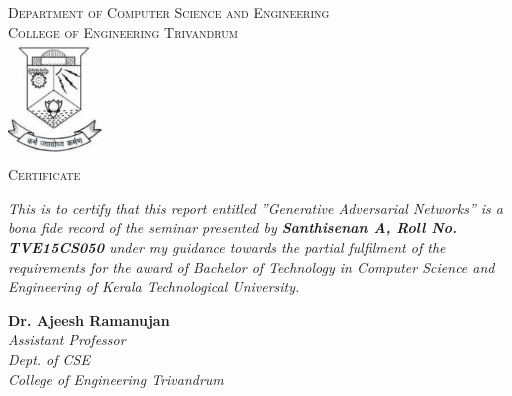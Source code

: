     \begin{center}
        \textsc{\Large{Department of Computer Science and Engineering}}\\[0.25cm]
        \textsc{\Large{College of Engineering Trivandrum}}\\[0.75cm]
        \includegraphics[width=2.5cm]{images/emblem.pdf}\\[1cm]
        
        \textsc{\LARGE{Certificate}}\\
        \justify
        \begin{doublespace}
            \textit{This is to certify that this report entitled 
            ''Generative Adversarial Networks'' is a bona fide record of the seminar 
            presented by \textbf{Santhisenan A, Roll No. TVE15CS050} under my 
            guidance towards the partial fulfilment of the requirements for the 
            award of Bachelor of Technology in Computer Science and Engineering of 
            Kerala Technological University.}\\[1cm]
        \end{doublespace}

        \begin{minipage}{0.4\textwidth}
        \begin{flushleft}
        \noindent\textbf{Dr. Ajeesh Ramanujan}\\[0.25cm]
        \textit{Assistant Professor\\[0.25cm]
        Dept. of CSE\\[0.25cm]
        College of Engineering
        Trivandrum}
        \end{flushleft}
        \end{minipage}

    \end{center}